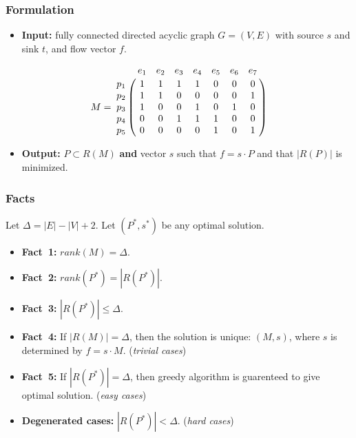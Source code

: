 \frame
{
	\frametitle{Formulation}

	\begin{itemize}
	\item<1-> {\bf Input:} fully connected directed acyclic graph $G=(V,E)$ with source $s$ and sink $t$,
		and flow vector $f$.
	\end{itemize}

	\vspace{0.8cm}
	
	\vspace{-0.1cm}

	\begin{displaymath}
	M = \bordermatrix{
		~   & e_1 & e_2 & e_3 & e_4 & e_5 & e_6 & e_7 \cr
		p_1 & 1 & 1 & 1 & 1 & 0 & 0 & 0 \cr
		p_2 & 1 & 1 & 0 & 0 & 0 & 0 & 1 \cr
		p_3 & 1 & 0 & 0 & 1 & 0 & 1 & 0 \cr
		p_4 & 0 & 0 & 1 & 1 & 1 & 0 & 0 \cr
		p_5 & 0 & 0 & 0 & 0 & 1 & 0 & 1 \cr
	}
	\end{displaymath}

	\vspace{0.1cm}

	\begin{itemize}
	\item<1-> {\bf Output:} $P\subset R(M)$ {\bf and} vector $s$
		such that $f = s\cdot P$ and that $|R(P)|$ is minimized.
	\end{itemize}
}

\frame
{
	\frametitle{Facts}
	Let $\Delta = |E| - |V| + 2$. Let $(P^*, s^*)$ be any optimal solution.
	\vspace{0.3cm}
	\begin{itemize}
	\item<1-> {\bf Fact~1:} $rank(M) = \Delta$.
	\vspace{0.3cm}
	\item<1-> {\bf Fact~2:} $rank(P^*) = |R(P^*)|$.
	\vspace{0.3cm}
	\item<1-> {\bf Fact~3:} $|R(P^*)| \le \Delta$.
	\vspace{0.3cm}
	\item<1-> {\bf Fact~4:} If $|R(M)| = \Delta$, then the solution is unique: $(M, s)$, where
		$s$ is determined by $f = s\cdot M$. ({\it trivial cases})
	\vspace{0.3cm}
	\item<1-> {\bf Fact~5:} If $|R(P^*)| = \Delta$, then greedy algorithm is guarenteed to give optimal solution. ({\it easy cases})
	\vspace{0.3cm}
	\item<1-> {\bf Degenerated cases:} $|R(P^*)| < \Delta$. ({\it hard cases})
	\end{itemize}
}

